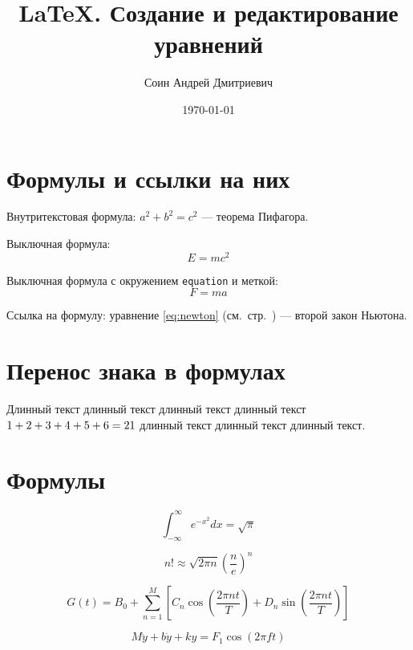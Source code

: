 \documentclass[a4paper,12pt]{article}
\author{Соин Андрей Дмитриевич}
\title{\LaTeX. Создание и редактирование уравнений}
\date{\today}
\newcommand*{\hm}[1]{#1\nobreak\discretionary{}
{\hbox{$\mathsurround=0pt #1$}}{}}
\theoremstyle{definition}
\theoremstyle{remark}
\begin{document}

\maketitle

\section{Формулы и ссылки на них}

Внутритекстовая формула: $a^2 + b^2 = c^2$ — теорема Пифагора.

Выключная формула:
\[
  E = mc^2
\]

Выключная формула с окружением \texttt{equation} и меткой:
\begin{equation}\label{eq:newton}
  F = ma
\end{equation}

Ссылка на формулу: уравнение \eqref{eq:newton} (см.~стр.~\pageref{eq:newton}) — второй закон Ньютона.

\section{Перенос знака в формулах}

Длинный текст длинный текст длинный текст длинный текст
$1\hm{+}2\hm{+}3\hm{+}4\hm{+}5\hm{+}6=21$ длинный текст длинный текст длинный текст.

\section{Формулы}

\begin{equation}
  \int_{-\infty}^{\infty} e^{-x^2} dx = \sqrt{\pi}
\end{equation}

\begin{equation}
  n! \approx \sqrt{2\pi n} \left(\frac{n}{e}\right)^n
\end{equation}

\begin{equation}
  G(t) = B_0 + \sum_{n=1}^{M} \left[ C_n \cos\left(\frac{2\pi n t}{T}\right) + D_n \sin\left(\frac{2\pi n t}{T}\right) \right]
\end{equation}

\begin{equation}
  M\ddot{y} + b\dot{y} + ky = F_1 \cos(2\pi ft)
\end{equation}
\end{document}
